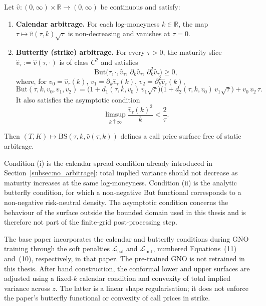 \begin{theorem}
\label{thm:volatility_validation}
Let $\hat{v} : (0,\infty) \times \mathbb{R} \to (0,\infty)$ be continuous and satisfy:
\begin{enumerate}
    \item[\textup{(i)}] \textbf{Calendar arbitrage.} For each log-moneyness $k \in \mathbb{R}$, the map $\tau \mapsto \hat{v}(\tau, k)\sqrt{\tau}$ is non-decreasing and vanishes at $\tau = 0$.
    \item[\textup{(ii)}] \textbf{Butterfly (strike) arbitrage.} For every $\tau > 0$, the maturity slice $\hat{v}_\tau := \hat{v}(\tau, \cdot)$ is of class $C^2$ and satisfies
    \begin{equation}
        \text{But}\big(\tau, \cdot, \hat{v}_\tau,\, \partial_k \hat{v}_\tau,\, \partial_k^2 \hat{v}_\tau\big) \geq 0,
        \label{eq:but_functional_condition}
    \end{equation}
    where, for $v_0 = \hat{v}_\tau(k)$, $v_1 = \partial_k \hat{v}_\tau(k)$, $v_2 = \partial_k^2 \hat{v}_\tau(k)$,
    \begin{equation}
        \text{But}(\tau, k, v_0, v_1, v_2) = \Big(1 + d_1(\tau,k,v_0)\, v_1 \sqrt{\tau}\Big)\Big(1 + d_2(\tau,k,v_0)\, v_1\sqrt{\tau}\Big) + v_0\, v_2\, \tau.
        \label{eq:but_functional}
    \end{equation}
    It also satisfies the asymptotic condition
    \begin{equation}
        \limsup_{k\uparrow\infty}\frac{\hat{v}_\tau(k)^2}{k}<\frac{2}{\tau}.
        \label{eq:wing_condition}
    \end{equation}
\end{enumerate}
Then $(T, K) \mapsto \text{BS}(\tau, k, \hat{v}(\tau,k))$ defines a call price surface free of static arbitrage.
\end{theorem}

Condition (i) is the calendar spread condition already introduced in Section~\ref{subsec:no_arbitrage}: total implied variance should not decrease as maturity increases at the same log-moneyness. Condition (ii) is the analytic butterfly condition, for which a non-negative $\text{But}$ functional corresponds to a non-negative risk-neutral density. The asymptotic condition concerns the behaviour of the surface outside the bounded domain used in this thesis and is therefore not part of the finite-grid post-processing step.

The base paper incorporates the calendar and butterfly conditions during GNO training through the soft penalties $\mathcal{L}_{\text{cal}}$ and $\mathcal{L}_{\text{but}}$, numbered Equations~(11) and~(10), respectively, in that paper. The pre-trained GNO is not retrained in this thesis. After band construction, the conformal lower and upper surfaces are adjusted using a fixed-$k$ calendar condition and convexity of total implied variance across $z$. The latter is a linear shape regularisation; it does not enforce the paper's butterfly functional or convexity of call prices in strike.

